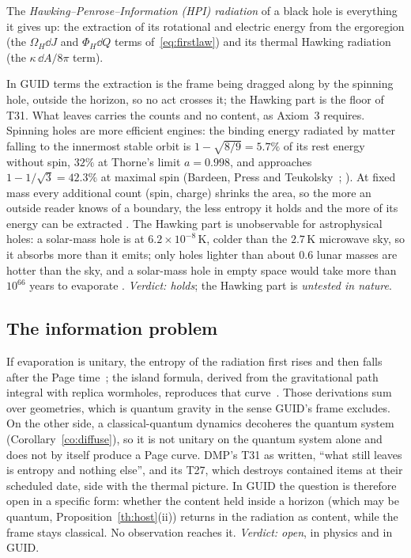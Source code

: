 \begin{definition}
The \emph{Hawking--Penrose--Information (HPI) radiation} of a black hole is everything it gives up: the extraction of its rotational and
electric energy from the ergoregion (the $\Omega_H\dd J$ and $\Phi_H\dd Q$ terms of~\eqref{eq:firstlaw}) and its thermal Hawking radiation (the
$\kappa\,\dd A/8\pi$ term).
\end{definition}

In GUID terms the extraction is the frame being dragged along by the spinning hole, outside the horizon, so no act crosses it; the
Hawking part is the floor of T31. What leaves carries the counts and no content, as Axiom~3 requires. Spinning holes are more efficient
engines: the binding energy radiated by matter falling to the innermost stable orbit is $1-\sqrt{8/9}=5.7\%$ of its rest energy without
spin, $32\%$ at Thorne's limit $a=0.998$, and approaches $1-1/\sqrt3=42.3\%$ at maximal spin (Bardeen, Press and Teukolsky~\cite{bpt};
). At fixed mass every additional count (spin, charge) shrinks the area, so the more an outside reader knows of a boundary, the
less entropy it holds and the more of its energy can be extracted \tagP. The Hawking part is unobservable for astrophysical holes: a
solar-mass hole is at $6.2\times10^{-8}$\,K, colder than the $2.7$\,K microwave sky, so it absorbs more than it emits; only holes lighter
than about $0.6$ lunar masses are hotter than the sky, and a solar-mass hole in empty space would take more than $10^{66}$ years to
evaporate . \emph{Verdict: holds}; the Hawking part is \emph{untested in nature}.

\subsection{The information problem}

If evaporation is unitary, the entropy of the radiation first rises and then falls after the Page time~\cite{page93}; the island formula,
derived from the gravitational path integral with replica wormholes, reproduces that curve~\cite{penington,aemm}. Those derivations sum
over geometries, which is quantum gravity in the sense GUID's frame excludes. On the other side, a classical-quantum dynamics decoheres the
quantum system (Corollary~\ref{co:diffuse}), so it is not unitary on the quantum system alone and does not by itself produce a Page curve.
DMP's T31 as written, ``what still leaves is entropy and nothing else'', and its T27, which destroys contained items at their scheduled date,
side with the thermal picture. In GUID the question is therefore open in a specific form: whether the content held inside a horizon (which
may be quantum, Proposition~\ref{th:host}(ii)) returns in the radiation as content, while the frame stays classical. No observation reaches it.
\emph{Verdict: open}, in physics and in GUID.

